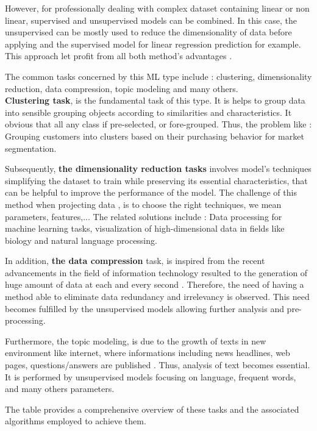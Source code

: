 \documentclass[12pt,a4paper]{report}
\begin{document}
However, for professionally dealing with complex dataset containing linear or non linear, supervised and unsupervised models can be combined. In this case, the unsupervised can be mostly used to reduce the dimensionality of data before applying and the supervised model for linear regression prediction for example. This approach let profit from all both method's advantages \cite{liu2000interactive}. 

The common tasks concerned by this ML type include : clustering, dimensionality reduction, data compression, topic modeling and many others. \\

\textbf{Clustering task}, is the fundamental task of this type. It is helps to group data into sensible grouping objects according to similarities and  characteristics. It obvious that all any class if pre-selected, or fore-grouped. Thus, the problem like : Grouping customers into clusters based on their purchasing behavior for market segmentation.

Subsequently, \textbf{the dimensionality reduction tasks} involves  model's techniques simplifying  the dataset to train while preserving its essential characteristics, that can be helpful to improve the performance of the model. The challenge of this method when projecting data \cite{sorzano2014survey}, is to choose the right techniques, we mean parameters, features,...  The related solutions include : Data processing for machine learning tasks, visualization of high-dimensional data in fields like biology and natural language processing. 

In addition, \textbf{the data compression} task, is inspired from the recent advancements in the field of information technology resulted to the generation of huge amount of data at each and every second \cite{jayasankar2021survey} . Therefore, the need of having a method able to eliminate data redundancy and irrelevancy is observed. This need becomes fulfilled by the unsupervised models allowing further analysis and pre-processing.

Furthermore, the topic modeling, is due to the growth of texts in new environment like internet, where informations including news headlines, web pages, questions/answers are published \cite{qiang2020short}. Thus, analysis of text becomes essential. It is performed by unsupervised models focusing on language, frequent words, and many others parameters.

The table provides a comprehensive overview of these tasks and the associated algorithms employed to achieve them.
\end{document}
